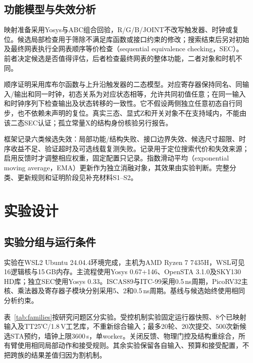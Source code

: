 \documentclass[twocolumn,10pt,fontset=windows]{ctexart}
\begin{document}
\subsection{功能模型与失效分析}\label{sec:validation}

映射准备采用Yosys与ABC\cite{abc}组合回验，R/G/B/JOINT不改写触发器、时钟或复位。候选局部检查用于筛除不满足库函数或接口约束的修改；搜索结束后另对初始及最终网表执行全网表顺序等价检查（sequential equivalence checking，SEC）。前者决定候选是否值得评估，后者检查最终网表的整体功能，二者对象和时机不同。

顺序证明采用库布尔函数与上升沿触发器的二态模型。对应寄存器保持同名、同输入/输出和同一时钟，初态关系为对应状态相等，允许共同初值任意；在同一输入和时钟序列下检查输出及状态转移的一致性。它不假设两侧独立任意初态自行同步，也不依赖未声明的复位。真实三态、显式Z和开关对象不在支持域内，不能由该二态SEC认证；孤立常量X的结构身份核验另行报告。

框架记录六类候选失效：局部功能/结构失败、接口边界失效、候选尺寸超限、时序收益不足、验证超时及可选线载复测失败。记录用于定位搜索代价和失效来源；启用反馈时才调整相应权重，固定配置只记录。指数滑动平均（exponential moving average，EMA）更新作为独立消融对象，其效果由实验判断。完整分类、更新规则和证明阶段见补充材料S1--S2。

\section{实验设计}

\subsection{实验分组与运行条件}

实验在WSL2 Ubuntu 24.04.4环境完成，主机为AMD Ryzen 7 7435H，WSL可见16逻辑核与15\,GB内存。主流程使用Yosys 0.67+146、OpenSTA 3.1.0及SKY130 HD库；独立SEC使用Yosys 0.33。ISCAS89\cite{iscas89}与ITC-99\cite{itc99}采用0.5\,ns周期，PicoRV32主核、乘法器及寄存器子模块分别采用5、2和0.5\,ns周期。基线与候选始终使用相同分析约束。

表~\ref{tab:families}按研究问题区分实验。受控机制实验固定运行器快照、8个已映射输入及TT25℃/1.8\,V工艺库，不重新综合输入；最多20轮、20次提交、500次新候选STA预约，墙钟上限3600\,s，单worker。关闭反馈、物理门控及结构重综合，所有臂使用相同局部动作和接受规则。其余实验保留各自输入、预算和接受配置，不把跨族的结果差值归因为割机制。
\end{document}
